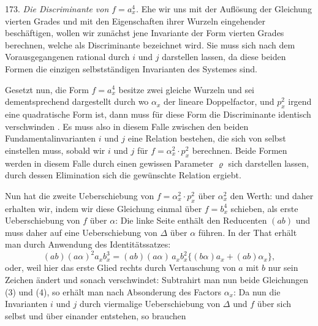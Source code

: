 173. \textit{Die Discriminante von $f=a_x^4$.} Ehe wir uns mit der Auflösung
 der Gleichung vierten Grades und mit den Eigenschaften ihrer
Wurzeln eingehender beschäftigen, wollen wir zunächst jene Invariante
der Form vierten Grades berechnen, welche als Discriminante bezeichnet
wird. Sie muss sich nach dem Vorausgegangenen rational durch $i$
und $j$ darstellen lassen, da diese beiden Formen die einzigen selbstständigen
 Invarianten des Systemes sind.

Gesetzt nun, die Form $f=a_x^4$ besitze zwei gleiche Wurzeln und
sei dementsprechend dargestellt durch
wo $\alpha_x$ der lineare Doppelfactor, und $p_x^2$ irgend eine quadratische Form
ist, dann muss für diese Form die Discriminante identisch verschwinden
. Es muss also in diesem Falle zwischen den beiden Fundamentalinvarianten
 $i$ und $j$ eine Relation bestehen, die sich von selbst
einstellen muss, sobald wir $i$ und $j$ für $f=\alpha_x^2\cdot p_x^2$ berechnen. Beide
Formen werden in diesem Falle durch einen gewissen Parameter $\varrho$
sich darstellen lassen, durch dessen Elimination sich die gewünschte
Relation ergiebt.

Nun hat die zweite Ueberschiebung von $f=\alpha_x^2\cdot p_x^2$ über $\alpha_x^2$ den
Werth:
und daher erhalten wir, indem wir diese Gleichung einmal über
$f=b_x^4$ schieben, als erste Ueberschiebung von $f$ über $\alpha$:
Die linke Seite enthält den Reducenten $(ab)$ und muss daher auf eine
Ueberschiebung von $\varDelta$ über $\alpha$ führen. In der That erhält man durch
Anwendung des Identitätssatzes:
\[
(ab)(a\alpha)^2 a_x b_x^3 = (ab)(a\alpha)\,a_x b_x^2\{(b\alpha)a_x + (ab)\alpha_x\},
\]
oder, weil hier das erste Glied rechts durch Vertauschung von $a$ mit
$b$ nur sein Zeichen ändert und sonach verschwindet:
Subtrahirt man nun beide Gleichungen (3) und (4), so erhält man
nach Absonderung des Factors $\alpha_x$:
Da nun die Invarianten $i$ und $j$ durch viermalige Ueberschiebung von
$\varDelta$ und $f$ über sich selbst und über einander entstehen, so brauchen


